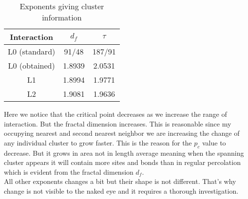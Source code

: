 \begin{table}
	\centering
	\begin{tabular}{|c|c|c|}
		\hline
		Interaction 	& $d_f$   & $\tau$   \\ \hline
		L0 (standard) 	& 91/48   & 187/91   \\ \hline
		L0 (obtained)	& 1.8939  & 2.0531 \\ \hline
		L1				& 1.8994  & 1.9771     \\ \hline
		L2				& 1.9081  & 1.9636   \\ \hline
	\end{tabular}
	\caption{Exponents giving cluster information}
	\label{tab:cluster-info}
\end{table}
		
Here we notice that the critical point decreases as we increase the range of interaction. But the fractal dimension increases. This is reasonable since my occupying nearest and second nearest neighbor we are increasing the change of any individual cluster to grow faster. This is the reason for the $p_c$ value to decrease. But it grows in area not in length average meaning when the spanning cluster appears it will contain more sites and bonds than in regular percolation which is evident from the fractal dimension $d_f$. \\
All other exponents changes a bit but their shape is not different. That's why change is not visible to the naked eye and it requires a thorough investigation.